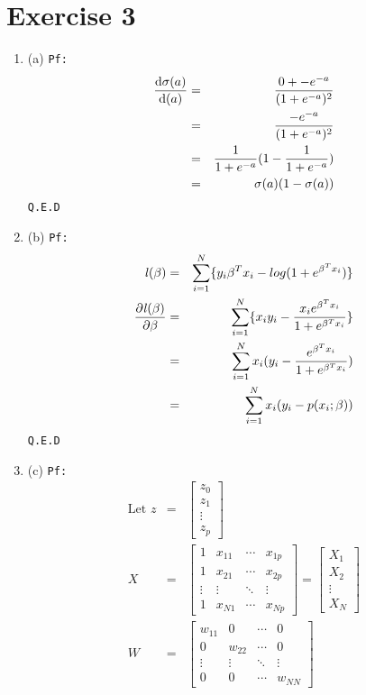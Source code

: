 \documentclass[a4paper]{article}
\begin{document}
\section{Exercise 3}
\begin{enumerate}
\item{(a)}
\texttt{Pf:}
\begin{eqnarray*}
	\frac{\mathrm{d}{\sigma(a)}}{\mathrm{d}{(a)}} &=& \frac{0 + -e^{-a}}{(1+e^{-a})^2}\\
	&=& \frac{-e^{-a}}{(1+e^{-a})^2}\\
	&=& \frac{1}{1+e^{-a}}(1-\frac{1}{1+e^{-a}})\\
	&=& \sigma{(a)}(1-\sigma{(a)})\\
\end{eqnarray*}
\texttt{Q.E.D}
\item{(b)}
\texttt{Pf:}
\begin{eqnarray*}
	\mathit{l}{(\beta)} &=& \sum_{i=1}^{N}\{y_i{\beta}^{T}x_i - log(1+e^{{\beta}^{T}x_i})  \}\\
	\frac{\partial{\mathit{l}{(\beta)} }}{\partial \beta} &=& \sum_{i=1}^{N}\{ x_i y_i - \frac{x_i e^{{\beta}^{T}x_i}}{1+e^{{{\beta}^{T}x_i}}} \}\\
	&=&  \sum_{i=1}^{N} x_i(y_i - \frac{e^{{\beta}^{T}x_i}}{1+e^{{{\beta}^{T}x_i}}})\\
	&=&  \sum_{i=1}^{N} x_i(y_i - p(x_i;\beta))
\end{eqnarray*}
\texttt{Q.E.D}
\item{(c)}
\texttt{Pf:}
\begin{eqnarray*}
	\text{Let } z &=& \left[ \begin{array}{c} z_0 \\ z_1\\ \vdots \\z_p \end{array} \right] \\
	X  &=& \begin{bmatrix} 1 & x_{11} & \cdots & x_{1p} \\ 1 & x_{21}  & \cdots & x_{2p}\\ \vdots & \vdots & \ddots & \vdots \\ 1 & x_{N1} & \cdots & x_{Np} \end{bmatrix}  =  \left[ \begin{array}{c} X_1 \\ X_2\\ \vdots \\X_N \end{array} \right]\\
	W &=& \begin{bmatrix} w_{11} & 0 & \cdots & 0 \\ 0 & w_{22}  & \cdots & 0\\ \vdots & \vdots & \ddots & \vdots \\ 0 & 0 & \cdots & w_{NN} \end{bmatrix}\\

\end{eqnarray*}
\end{enumerate}
\end{document}
